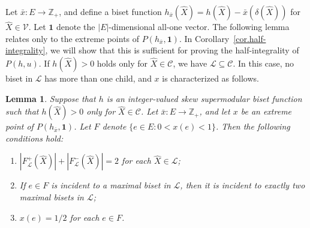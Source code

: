 \documentclass{article}
\newtheorem{lemma}{Lemma}
\newcommand{\Cfam}{\mathcal{C}}
\newcommand{\Vfam}{\mathcal{V}}
\newcommand{\Lfam}{\mathcal{L}}
\newcommand{\Zset}{\mathbb{Z}}
\newcommand{\allone}{\mathbf{1}}
\newcommand{\cut}{P}
\begin{document}
Let $\bar{x}\colon E \rightarrow \Zset_+$,
and define a biset function 
$h_{\bar{x}}(\hat{X})=h(\hat{X})-\bar{x}(\delta(\hat{X}))$ for $\hat{X} \in \Vfam$.
Let $\allone$ denote the $|E|$-dimensional all-one vector.
The following lemma relates only to the extreme points of $\cut(h_{\bar{x}},\allone)$.
In Corollary~\ref{cor.half-integrality}, we will show
that this is sufficient for proving the half-integrality of $\cut(h,u)$.
If $h(\hat{X}) > 0$ holds only for $\hat{X} \in \Cfam$, 
we have $\Lfam \subseteq \Cfam$. In this case, no biset in $\Lfam$ 
has more than one child, and $x$ is characterized as follows.

\begin{lemma}\label{lem.terminal-characterization}
Suppose that $h$ is an integer-valued skew supermodular biset function 
such that $h(\hat{X})>0$ only for $\hat{X} \in \Cfam$.
Let $\bar{x}\colon E \rightarrow \Zset_+$,
and let $x$ be an extreme point of $\cut(h_{\bar{x}},\allone)$.
Let $F$ denote $\{e \in E\colon 0 < x(e) < 1\}$.
 Then the following conditions hold\/{\rm :}
 \begin{enumerate}
  	\item[\rm (i)] $|F^+_{\Lfam}(\hat{X})|+ |F^-_{\Lfam}(\hat{X})| =2$ 
	     for each $\hat{X} \in \Lfam$\/{\rm ;}
  	\item[\rm (ii)] If $e \in F$ is incident to a maximal biset in $\Lfam$, then it is incident to
  	exactly two maximal bisets in $\Lfam$\/{\rm ;}
  	\item[\rm (iii)] $x(e)=1/2$ for each $e \in F$.
 \end{enumerate}
\end{lemma}
\end{document}

